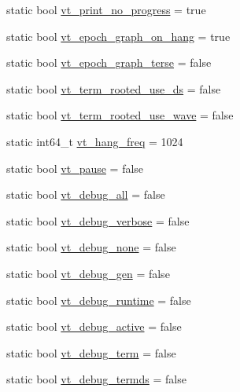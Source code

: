 \begin{DoxyCompactItemize}
static bool \hyperlink{structvt_1_1arguments_1_1_arg_config_a6bbdd118f6e731cd446afb5e33af11bf}{vt\+\_\+print\+\_\+no\+\_\+progress} = true
\item 
static bool \hyperlink{structvt_1_1arguments_1_1_arg_config_ac691ea78d2c3079f3600f053f4fffa11}{vt\+\_\+epoch\+\_\+graph\+\_\+on\+\_\+hang} = true
\item 
static bool \hyperlink{structvt_1_1arguments_1_1_arg_config_a86447854a05bfbe2223a2e5a3561e78f}{vt\+\_\+epoch\+\_\+graph\+\_\+terse} = false
\item 
static bool \hyperlink{structvt_1_1arguments_1_1_arg_config_a7fad2709c0787c6ae775a83680ad9914}{vt\+\_\+term\+\_\+rooted\+\_\+use\+\_\+ds} = false
\item 
static bool \hyperlink{structvt_1_1arguments_1_1_arg_config_a1bd318b03ae9b5e87c2c7f2cde4a2a72}{vt\+\_\+term\+\_\+rooted\+\_\+use\+\_\+wave} = false
\item 
static int64\+\_\+t \hyperlink{structvt_1_1arguments_1_1_arg_config_a8bcbaf567f64aac567993c064179a5e5}{vt\+\_\+hang\+\_\+freq} = 1024
\item 
static bool \hyperlink{structvt_1_1arguments_1_1_arg_config_a46f31e594725bd599f66b0a0682162bc}{vt\+\_\+pause} = false
\item 
static bool \hyperlink{structvt_1_1arguments_1_1_arg_config_a2bad2770bdb9bfb9bb8f9cd6cd9ae492}{vt\+\_\+debug\+\_\+all} = false
\item 
static bool \hyperlink{structvt_1_1arguments_1_1_arg_config_ad863fc3da4d2e0e3ce0b36647da8e29b}{vt\+\_\+debug\+\_\+verbose} = false
\item 
static bool \hyperlink{structvt_1_1arguments_1_1_arg_config_ad8244f0e0ba0f2b2cbf2bc5f58acc5b0}{vt\+\_\+debug\+\_\+none} = false
\item 
static bool \hyperlink{structvt_1_1arguments_1_1_arg_config_a6c897d45359f0cae8d31f3817bbb9b60}{vt\+\_\+debug\+\_\+gen} = false
\item 
static bool \hyperlink{structvt_1_1arguments_1_1_arg_config_ae09f0220544451872310ed5188b98d9b}{vt\+\_\+debug\+\_\+runtime} = false
\item 
static bool \hyperlink{structvt_1_1arguments_1_1_arg_config_aa40cb6ebcb449382ec1da2d73855de1f}{vt\+\_\+debug\+\_\+active} = false
\item 
static bool \hyperlink{structvt_1_1arguments_1_1_arg_config_aff950c7950ea868ccc78769a9a9ccf45}{vt\+\_\+debug\+\_\+term} = false
\item 
static bool \hyperlink{structvt_1_1arguments_1_1_arg_config_abcc1685602fa86f685601ad4f65c422e}{vt\+\_\+debug\+\_\+termds} = false

\end{DoxyCompactItemize}
